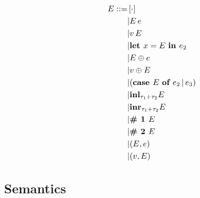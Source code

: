 \documentclass{article}
\begin{document}
\begin{multicols}{2}
\begin{equation*}
\begin{split}
				E ::=
				&\, [\cdot] \\
				&| E\, e \\
				&| v\, E \\
				&| \text{\bf let } x = E \text{ \bf in } e_2 \\
				&| E \oplus e \\
				&| v \oplus E \\
				&| (\text{\bf case } E \text{ \bf of } e_2 \,|\, e_3) \\
				&| {\bf inl}_{\tau_1 + \tau_2} E \\
				&| {\bf inr}_{\tau_1 + \tau_2} E \\
				&| \text{\bf \# 1 } E \\
				&| \text{\bf \# 2 } E \\
				&| (E, e) \\
				&| (v, E) \\
			\end{split}
		\end{equation*}
	\end{multicols}

		\subsection{Semantics}
\end{document}
